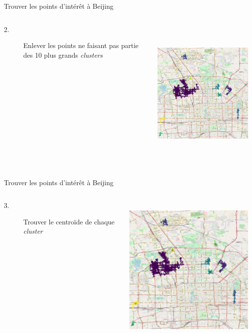 \documentclass[aspectratio=169]{beamer}
\begin{document}
\begin{frame}{Trouver les points d'intérêt à Beijing}
\begin{columns}
\begin{column}{0.5\textwidth}
\begin{description}
	\item [2.] Enlever les points ne faisant pas partie des 10 plus grands \textit{clusters}
\end{description}
\end{column}
\begin{column}{0.5\textwidth}  %
     \centering
	\includegraphics[height=7.5cm]{figures/reduced_map}
\end{column}
\end{columns}
\end{frame}

\begin{frame}{Trouver les points d'intérêt à Beijing}
\begin{columns}
\begin{column}{0.5\textwidth}
\begin{description}
	\item [3.] Trouver le centroïde de chaque \textit{cluster}
\end{description}
\end{column}
\begin{column}{0.5\textwidth}  %
     \centering
	\includegraphics[height=7.5cm]{figures/annotated_map}
\end{column}
\end{columns}
\end{frame}
\end{document}
